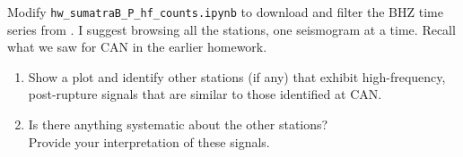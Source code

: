 
Modify {\tt hw\_sumatraB\_P\_hf\_counts.ipynb}
to download and filter the BHZ time series from . 
I suggest browsing all the stations, one seismogram at a time.
Recall what we saw for CAN in the earlier homework.
%
\begin{enumerate}
\item Show a plot and identify other stations (if any) that exhibit high-frequency, post-rupture signals that are similar to those identified at CAN.
\item Is there anything systematic about the other stations? \\
Provide your interpretation of these signals.
\end{enumerate}
